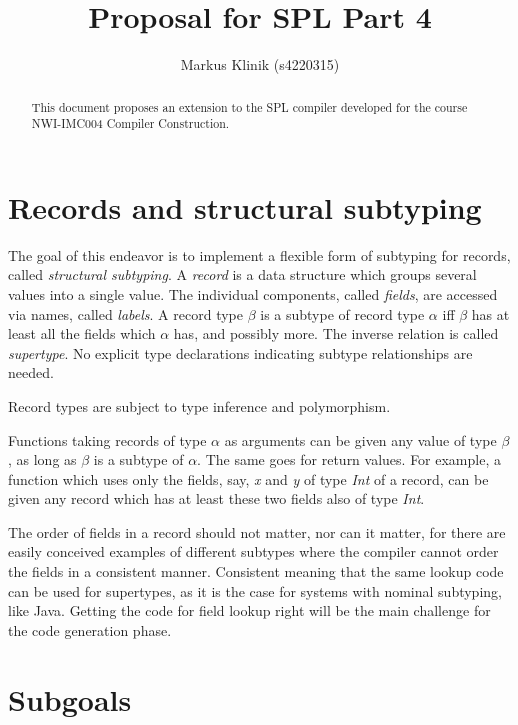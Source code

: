 \documentclass[a4paper]{article}
\begin{document}
\title{Proposal for SPL Part 4}
\author{Markus Klinik (s4220315)}
\maketitle

\begin{abstract}

This document proposes an extension to the SPL compiler developed for the course
NWI-IMC004 Compiler Construction.

\end{abstract}

\section{Records and structural subtyping}

The goal of this endeavor is to implement a flexible form of subtyping for
records, called \emph{structural subtyping}.  A \emph{record} is a data
structure which groups several values into a single value.  The individual
components, called \emph{fields}, are accessed via names, called \emph{labels}.
A record type $\beta$ is a subtype of record type $\alpha$ iff $\beta$ has at
least all the fields which $\alpha$ has, and possibly more.  The inverse
relation is called \emph{supertype}. No explicit type declarations indicating
subtype relationships are needed.

Record types are subject to type inference and polymorphism.

Functions taking records of type $\alpha$ as arguments can be given any value of
type $\beta$, as long as $\beta$ is a subtype of $\alpha$.  The same goes for
return values.  For example, a function which uses only the fields, say,
\emph{x} and \emph{y} of type \emph{Int} of a record, can be given any record
which has at least these two fields also of type \emph{Int}.

The order of fields in a record should not matter, nor can it matter, for there
are easily conceived examples of different subtypes where the
compiler cannot order the fields in a consistent manner.  Consistent meaning
that the same lookup code can be used for supertypes, as it is the case for
systems with nominal subtyping, like Java.  Getting the code for field lookup
right will be the main challenge for the code generation phase.

\section{Subgoals}
\end{document}
